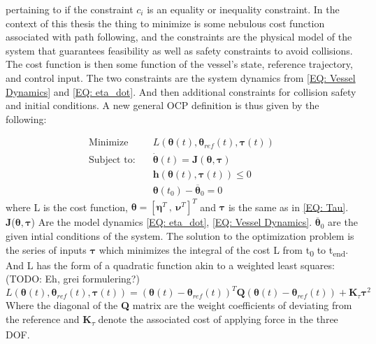 pertaining to if the constraint $c_i$ is an equality or inequality constraint. In the context of this thesis the thing to minimize is some nebulous cost function
associated with path following, and the constraints are the physical model of the system that guarantees feasibility as well as safety constraints to avoid collisions.
The cost function is then some function of the vessel's state, reference trajectory, and control input. The two constraints are the system dynamics from \ref{EQ: Vessel Dynamics}
and \ref{EQ: eta_dot}. And then additional constraints for collision safety and initial conditions. A new general \gls{OCP} definition is thus given by the following:

\begin{subequations}
    \label{EQ :OCP description}
\begin{align}
    \textrm{Minimize} \quad & {L}(\bm{\theta}(t), \bm{\theta}_{ref}(t), \bm{\tau}(t)) \\
    \textrm{Subject to:} \quad & \dot{\bm{\theta}}(t) = \textbf{J}(\bm{\theta}, \bm{\tau}) \\
                         \quad & \textbf{h}(\bm{\theta}(t), \bm{\tau}(t)) \leq 0 \\
                         \quad & \bm{\theta}(t_0) - \overline{\bm{\theta}}_0 = 0
\end{align}
\end{subequations}
where L is the cost function, $\bm{\theta} = [\bm{\eta}^T \ , \ \bm{\nu}^T]^T$ and $\bm{\tau}$ is the same as in \ref{EQ: Tau}. 
\textbf{J}($\bm{\theta}, \bm{\tau}$) Are the model dynamics \ref{EQ: eta_dot}, \ref{EQ: Vessel Dynamics}. $\overline{\bm{\theta}}_0$ are the
given intial conditions of the system.
The solution to the optimization problem is the series of inputs $\bm{\tau}$ which minimizes the integral of the cost L 
from t\textsubscript{0} to t\textsubscript{end}. And L has the form of a quadratic function
akin to a weighted least squares: (TODO: Eh, grei formulering?)
\begin{equation}
    L(\bm{\theta}(t), \bm{\theta}_{ref}(t), \bm{\tau}(t)) = (\bm{\theta}(t) - \bm{\theta}_{ref}(t))^T \textbf{Q} (\bm{\theta}(t) - \bm{\theta}_{ref}(t)) + \textbf{K}_\tau \bm{\tau}^2
\end{equation}
Where the diagonal of the \textbf{Q} matrix are the weight coefficients of deviating from the reference
and \textbf{K}\textsubscript{$\tau$} denote the associated cost of applying force in the three \gls{DOF}.

